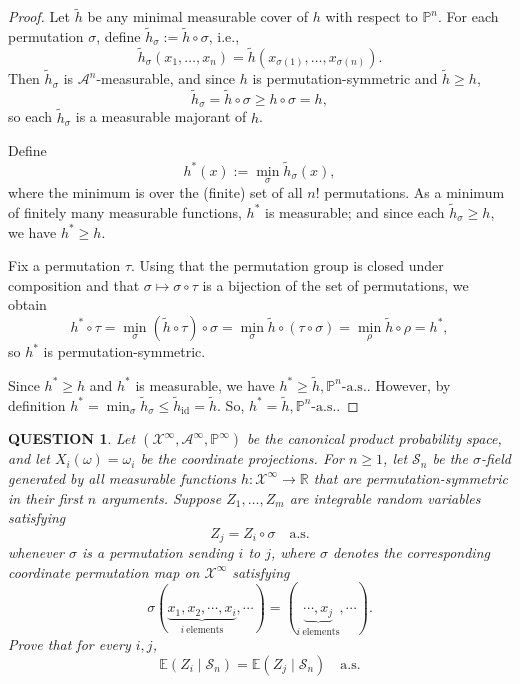 \documentclass[12pt]{article}
\renewcommand{\(}{\left(}%
\renewcommand{\)}{\right)}%
\renewcommand{\[}{\left[}%
\renewcommand{\]}{\right]}%
\newcommand{\p}{\mathbb{P}}
\newtheorem{question}{QUESTION}[section]}
\newtheorem{proof}{Proof.}}
\begin{document}
\begin{proof}
Let $\tilde h$ be any minimal measurable cover of $h$ with respect to $\p^n$. For each permutation $\sigma$, define $\tilde h_\sigma:=\tilde h\circ\sigma$, i.e.,
\begin{equation*}
\tilde h_\sigma(x_1,\dots,x_n)=\tilde h(x_{\sigma(1)},\dots,x_{\sigma(n)}).
\end{equation*}
Then $\tilde h_\sigma$ is $\mathcal A^n$-measurable, and since $h$ is permutation-symmetric and $\tilde h\ge h$,
\begin{equation*}
\tilde h_\sigma=\tilde h\circ\sigma\ge h\circ\sigma= h,
\end{equation*}
so each $\tilde h_\sigma$ is a measurable majorant of $h$.

Define
\begin{equation*}
h^*(x):=\min_{\sigma}\tilde h_\sigma(x),
\end{equation*}
where the minimum is over the (finite) set of all $n!$ permutations. As a minimum of finitely many measurable functions, $h^*$ is measurable; and since each $\tilde h_\sigma\ge h$, we have $h^*\ge h$.

Fix a permutation $\tau$. Using that the permutation group is closed under composition and that $\sigma\mapsto\sigma\circ\tau$ is a bijection of the set of permutations, we obtain
\begin{equation*}
h^*\circ\tau
=\min_{\sigma} (\tilde h\circ \tau)\circ \sigma 
=\min_{\sigma} \tilde h\circ (\tau\circ \sigma)
=\min_{\rho}\tilde h\circ\rho
=h^*,
\end{equation*}
so $h^*$ is permutation-symmetric.

Since $h^*\geq h$ and $h^*$ is measurable, we have $h^*\geq \tilde h,\p^n\text{-a.s.}$. However, by definition $h^*=\min_\sigma \tilde h_\sigma\leq \tilde h_{\mathrm{id}}=\tilde h$. So, $h^*=\tilde h,\p^n\text{-a.s.}$.
\end{proof}

\begin{question}
Let $(\mathcal X^\infty,\mathcal A^\infty,\p^\infty)$ be the canonical product probability space, and let $X_i(\omega)=\omega_i$ be the coordinate projections.  For $n \ge 1$, let $\mathscr S_n$ be the $\sigma$-field generated by all measurable functions $h:\mathcal X^\infty \to \mathbb R$ that are permutation-symmetric in their first $n$ arguments.  Suppose $Z_1,\dots,Z_m$ are integrable random variables satisfying
\begin{equation*}
Z_j = Z_i \circ \sigma \quad \text{a.s.}
\end{equation*}
whenever $\sigma$ is a permutation sending $i$ to $j$, where $\sigma$ denotes the corresponding coordinate permutation map on $\mathcal X^\infty$ satisfying 
\begin{equation*}
	\sigma (\underbrace{ x_1,x_2,\cdots,x_i}_{i\mathrm{\ elements}},\cdots)=(\underbrace{ \cdots,x_j}_{i\mathrm{\ elements}},\cdots).
\end{equation*}
Prove that for every $i,j$,
\begin{equation*}
\mathbb{E}(Z_i \mid \mathscr S_n)
=
\mathbb{E}(Z_j \mid \mathscr S_n)
\quad \text{a.s.}
\end{equation*}
\end{question}
\end{document}
